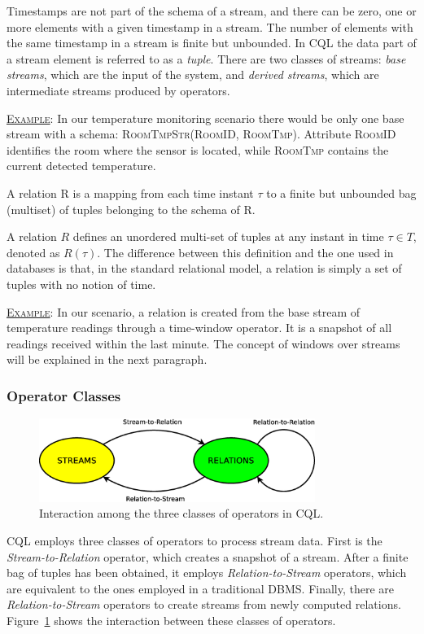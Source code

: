 Timestamps are not part of the schema of a stream, and there can be zero, one or more elements with
a given timestamp in a stream. The number of elements with the same timestamp in a stream is finite but
unbounded.
In CQL the data part of a stream element is referred to as a \textit{tuple}. There are
two classes of streams: \textit{base streams}, which are the input of the system, and \textit{derived
streams}, which are intermediate streams produced by operators. 

\underline{\textsc{Example}}: In our temperature monitoring scenario there would be only one base stream
with a schema: \textsc{RoomTmpStr(RoomID, RoomTmp)}. Attribute \textsc{RoomID} identifies the room where
the sensor is located, while \textsc{RoomTmp} contains the current detected temperature. 

\begin{definition}[Relation]{A relation R is a mapping from each time instant
$\tau$ to a finite but unbounded bag (multiset) of tuples belonging to the
schema of R.}
\end{definition}

A relation $R$ defines an unordered multi-set of tuples at any instant in time $\tau \in T$,
denoted as $R(\tau)$. The difference between this definition and the one used in databases is that, in
the standard relational model, a relation is simply a set of tuples with no notion of time. 

\underline{\textsc{Example}}: In our scenario, a relation is created from the base stream of
temperature readings through a time-window operator. It is a snapshot of all readings received within the last
minute. The concept of windows over streams will be explained in the next paragraph.

\subsubsection*{Operator Classes}
\begin{figure}[b]
	\centering
	\includegraphics[width=0.8\textwidth]{img/tesi/cql_ops} 
	\caption{Interaction among the three classes of operators in CQL.}
	\label{fig:cql_ops}
\end{figure}
CQL employs three classes of operators to process stream data. First is the \textit{Stream-to-Relation}
operator, which creates a snapshot of a stream. After a finite bag of tuples has been
obtained, it employs \textit{Relation-to-Stream} operators, which are equivalent to the ones employed in
a traditional DBMS. Finally, there are \textit{Relation-to-Stream} operators to create streams from
newly computed relations. Figure~\ref{fig:cql_ops} shows the interaction between these classes of
operators. 

